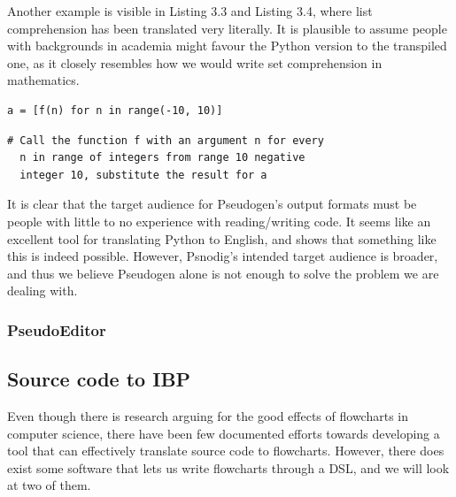 Another example is visible in Listing 3.3 and Listing 3.4, where list comprehension has been translated very literally. It is plausible to assume people with backgrounds in academia might favour the Python version to the transpiled one, as it closely resembles how we would write set comprehension in mathematics. \hfill \\

\begin{lstlisting}[caption={A list comprehension of applying f(n) to integers in the range -10 to 10, and placing the results in a list}, captionpos=b]
a = [f(n) for n in range(-10, 10)]
\end{lstlisting}

\begin{lstlisting}[caption={The result of transpiling the code in Listing ?? with Pseudogen}, captionpos=b]
# Call the function f with an argument n for every
  n in range of integers from range 10 negative
  integer 10, substitute the result for a
\end{lstlisting}

It is clear that the target audience for Pseudogen's output formats must be people with little to no experience with reading/writing code. It seems like an excellent tool for translating Python to English, and shows that something like this is indeed possible. However, Psnodig's intended target audience is broader, and thus we believe Pseudogen alone is not enough to solve the problem we are dealing with.

\subsubsection{PseudoEditor}



\subsection{Source code to IBP}

Even though there is research arguing for the good effects of flowcharts in computer science, there have been few documented efforts towards developing a tool that can effectively translate source code to flowcharts. However, there does exist some software that lets us write flowcharts through a DSL, and we will look at two of them.

